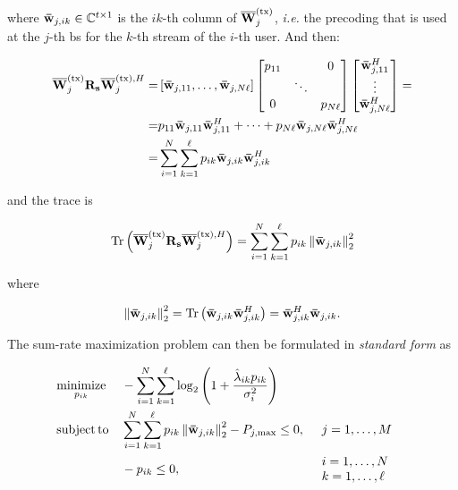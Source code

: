 \noindent
where $\mathbf{\bar{w}}_{j, ik} \in \mathbb{C}^{t \times 1}$ is the $ik$-th column of $\mathbf{\overline{W}}^{(\text{tx})}_j$,
\emph{i.e.} the precoding that is used at the $j$-th \gls{bs} for the $k$-th
stream of the $i$-th user.
And then:

\begin{equation}
\begin{aligned}
	\mathbf{\overline{W}}^{(\text{tx})}_j\mathbf{R}_{\mathbf{s}}\mathbf{\overline{W}}^{(\text{tx}),H}_j = &\left[\mathbf{\bar{w}}_{j,11}, \ldots, \mathbf{\bar{w}}_{j, N\ell}
	\right]
	\begin{bmatrix}
		p_{11} &        & 0\\
               & \ddots &  \\
		0      &        & p_{N\ell}

	\end{bmatrix}
	\begin{bmatrix}
		\mathbf{\bar{w}}_{j,11}^H\\
		\vdots\\
		\mathbf{\bar{w}}_{j,N\ell}^H
	\end{bmatrix} = \\
	= & p_{11}\mathbf{\bar{w}}_{j,11}\mathbf{\bar{w}}_{j,11}^H + \cdots + p_{N\ell}\mathbf{\bar{w}}_{j,N\ell}
	\mathbf{\bar{w}}_{j,N\ell}^H \\
	= & \sum\limits_{i = 1}^N\sum\limits_{k = 1}^\ell p_{ik}
	\mathbf{\bar{w}}_{j,ik}\mathbf{\bar{w}}_{j,ik}^H
\end{aligned}
\end{equation}

\noindent
and the trace is

\begin{equation} \label{eq:trace_terms_p_i}
	\operatorname*{Tr}\left(\mathbf{\overline{W}}^{(\text{tx})}_j \mathbf{R}_{\mathbf{s}} \mathbf{\overline{W}}^{(\text{tx}),H}_j\right) = \sum\limits_{i = 1}^N
	\sum\limits_{k = 1}^\ell p_{ik} \left\| \mathbf{\bar{w}}_{j, ik} \right\|_2^2
\end{equation}

\noindent
where

\begin{equation} \label{eq:norm2}
    \left\|\mathbf{\bar{w}}_{j,ik}\right\|_2^2 = \operatorname*{Tr}\left( \mathbf{\bar{w}}_{j,ik} \mathbf{\bar{w}}_{j,ik}^H
    \right) = \mathbf{\bar{w}}_{j,ik}^H \mathbf{\bar{w}}_{j,ik}.
\end{equation}

The sum-rate maximization problem can then be formulated in \emph{standard form}
\cite{boyd_convex} as

\begin{equation} \label{eq:sum_rate_maxim}
\begin{aligned}
	&\operatorname*{minimize}\limits_{p_{ik}} &&-\sum\limits_{i = 1}^N
	\sum\limits_{k = 1}^\ell \log_2\left( 1 +
	\frac{\hat{\lambda}_{ik} p_{ik}}{\sigma_i^2} \right)\\
	&\operatorname*{subject\,to} &&\sum\limits_{i = 1}^N \sum\limits_{k = 1}^\ell p_{ik} \left\|
	\mathbf{\bar{w}}_{j,ik} \right\|_2^2 - P_{j,\max} \leq 0, &&
    \begin{array}{l}
        j = 1, \ldots, M
    \end{array}\\
    & &&-p_{ik} \leq 0, &&
	\begin{array}{l}
	i = 1, \ldots, N\\
	k = 1, \ldots, \ell
	\end{array}
\end{aligned}
\end{equation}

